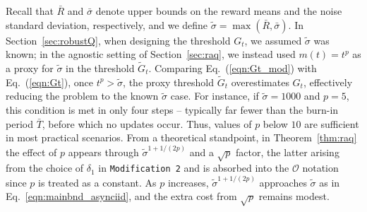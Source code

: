 \documentclass{article}
\newcommand{\mc}{\mathcal}
\begin{document}
Recall that $\bar{R}$ and $\bar{\sigma}$ denote upper bounds on the reward means and the noise standard deviation, respectively, and we define $\tilde{\sigma} = \max(\bar{R}, \bar{\sigma})$. In Section~\ref{sec:robustQ}, when designing the threshold $G_t$, we assumed $\tilde{\sigma}$ was known; in the agnostic setting of Section~\ref{sec:raq}, we instead used $m(t) = t^p$ as a proxy for $\tilde{\sigma}$ in the threshold $\tilde{G}_t$. Comparing Eq.~(\ref{eqn:Gt_mod}) with Eq.~(\ref{eqn:Gt}), once $t^p > \tilde{\sigma}$, the proxy threshold $\tilde{G}_t$ overestimates $G_t$, effectively reducing the problem to the known $\tilde{\sigma}$ case. For instance, if $\tilde{\sigma} = 1000$ and $p = 5$, this condition is met in only four steps -- typically far fewer than the burn-in period $\bar{T}$, before which no updates occur. Thus, values of $p$ below $10$ are sufficient in most practical scenarios. From a theoretical standpoint, in Theorem~\ref{thm:raq} the effect of $p$ appears through $\tilde{\sigma}^{1+1/(2p)}$ and a $\sqrt{p}$ factor, the latter arising from the choice of $\delta_1$ in  \texttt{\textcolor{winered}{Modification 2}} and is absorbed into the $\mc{O}$ notation since $p$ is treated as a constant. As $p$ increases, $\tilde{\sigma}^{1+1/(2p)}$ approaches $\tilde{\sigma}$ as in Eq.~\eqref{eqn:mainbnd_asynciid}, and the extra cost from $\sqrt{p}$ remains modest.
\newpage
\end{document}
